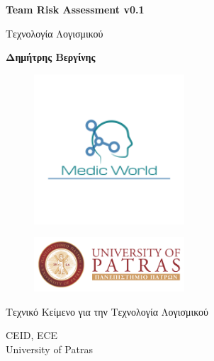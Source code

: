 \documentclass{article}
\begin{document}

\begin{titlepage}
   \begin{center}
       \vspace*{1cm}

       \textbf{\huge Team Risk Assessment v0.1}

       \vspace{0.5cm}
        Τεχνολογία Λογισμικού
            
       \vspace{1cm}

       \textbf{Δημήτρης Βεργίνης}
       
       \begin{figure}[!htb]
        \centering
        \includegraphics[width=0.5\textwidth]{logo.png}
        \end{figure}
        
        \vspace{0.5cm}
        
        \begin{figure}[!htb]
        \centering
        \includegraphics[width=0.5\textwidth]{ceid.jpg}
        \end{figure}


       \vfill
            
       Τεχνικό Κείμενο για την Τεχνολογία Λογισμικού\\
            
       \vspace{0.5cm}
            
       CEID, ECE\\
       University of Patras\\
            
   \end{center}
\end{titlepage}
\end{document}
